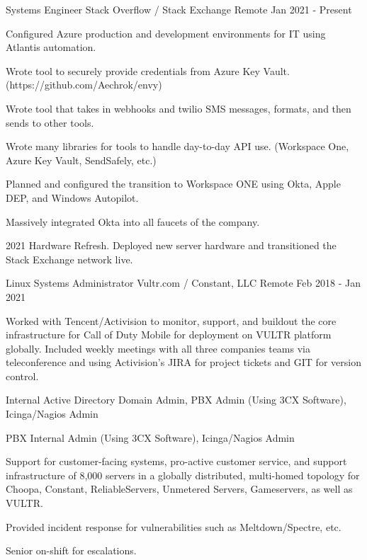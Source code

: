 
\begin{cventries}

	\cventry
	{Systems Engineer}
	{Stack Overflow / Stack Exchange}
	{Remote}
	{Jan 2021 - Present}
	{
		\begin{cvitems}
		\item {Configured Azure production and development environments for IT using Atlantis automation.}
		\item {Wrote tool to securely provide credentials from Azure Key Vault. (https://github.com/Aechrok/envy)}
		\item {Wrote tool that takes in webhooks and twilio SMS messages, formats, and then sends to other tools.}
		\item {Wrote many libraries for tools to handle day-to-day API use. (Workspace One, Azure Key Vault, SendSafely, etc.)}
		\item {Planned and configured the transition to Workspace ONE using Okta, Apple DEP, and Windows Autopilot.}
		\item {Massively integrated Okta into all faucets of the company.}
		\item {2021 Hardware Refresh. Deployed new server hardware and transitioned the Stack Exchange network live.}
		\end{cvitems}
	}


	\cventry
	{Linux Systems Administrator}
	{Vultr.com / Constant, LLC}
	{Remote}
	{Feb 2018 - Jan 2021}
	{
		\begin{cvitems}
		\item {Worked with Tencent/Activision to monitor, support, and buildout the core infrastructure for Call of Duty Mobile for deployment on VULTR platform globally. Included weekly meetings with all three companies teams via teleconference and using Activision's JIRA for project tickets and GIT for version control.}
		\item {Internal Active Directory Domain Admin, PBX Admin (Using 3CX Software), Icinga/Nagios Admin}
		\item {PBX Internal Admin (Using 3CX Software), Icinga/Nagios Admin}
		\item {Support for customer-facing systems, pro-active customer service, and support infrastructure of 8,000 servers in a globally distributed, multi-homed topology for Choopa, Constant, ReliableServers, Unmetered Servers, Gameservers, as well as VULTR.}
		\item {Provided incident response for vulnerabilities such as Meltdown/Spectre, etc.}
		\item {Senior on-shift for escalations.}
		\end{cvitems}
	}


\end{cventries}
